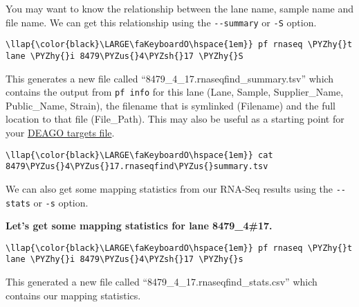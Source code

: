 \documentclass[11pt]{article}
\def\PYZus{\char`\_}
\def\PYZsh{\char`\#}
\def\PYZhy{\char`\-}
\begin{document}
    You may want to know the relationship between the lane name, sample name
and file name. We can get this relationship using the
\texttt{-\/-summary} or \texttt{-S} option.

\begin{terminalinput}
\begin{Verbatim}[commandchars=\\\{\}]
\llap{\color{black}\LARGE\faKeyboardO\hspace{1em}} pf rnaseq \PYZhy{}t lane \PYZhy{}i 8479\PYZus{}4\PYZsh{}17 \PYZhy{}S
\end{Verbatim}
\end{terminalinput}

    This generates a new file called ``8479\_4\_17.rnaseqfind\_summary.tsv''
which contains the output from \texttt{pf\ info} for this lane (Lane,
Sample, Supplier\_Name, Public\_Name, Strain), the filename that is
symlinked (Filename) and the full location to that file (File\_Path).
This may also be useful as a starting point for your
\href{https://github.com/sanger-pathogens/Bio-Deago/blob/master/user_guide/Input-files.ipynb}{DEAGO
targets file}.

\begin{terminalinput}
\begin{Verbatim}[commandchars=\\\{\}]
\llap{\color{black}\LARGE\faKeyboardO\hspace{1em}} cat 8479\PYZus{}4\PYZus{}17.rnaseqfind\PYZus{}summary.tsv
\end{Verbatim}
\end{terminalinput}

    We can also get some mapping statistics from our RNA-Seq results using
the \texttt{-\/-stats} or \texttt{-s} option.

\textbf{Let's get some mapping statistics for lane 8479\_4\#17.}

\begin{terminalinput}
\begin{Verbatim}[commandchars=\\\{\}]
\llap{\color{black}\LARGE\faKeyboardO\hspace{1em}} pf rnaseq \PYZhy{}t lane \PYZhy{}i 8479\PYZus{}4\PYZsh{}17 \PYZhy{}s
\end{Verbatim}
\end{terminalinput}

    This generated a new file called ``8479\_4\_17.rnaseqfind\_stats.csv''
which contains our mapping statistics.
\end{document}
